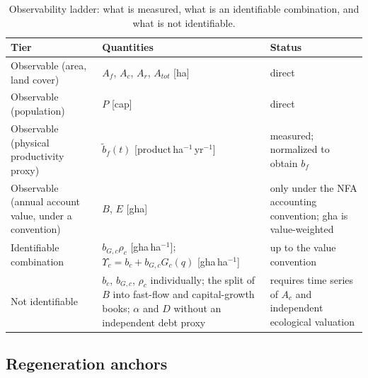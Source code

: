 \documentclass[11pt,a4paper]{article}
\newcommand{\Ups}{\Upsilon_c}
\begin{document}
\begin{table}[htbp]
\centering\small
\caption{Observability ladder: what is measured, what is an identifiable combination, and what is not identifiable.}
\label{tab:si_ladder}
\begin{tabularx}{\textwidth}{>{\raggedright\arraybackslash}p{} X >{\raggedright\arraybackslash}p{}}
\toprule
Tier & Quantities & Status \\
\midrule
Observable (area, land cover) & $A_f$, $A_c$, $A_r$, $A_{tot}$ [ha] & direct \\
Observable (population) & $P$ [cap] & direct \\
Observable (physical productivity proxy) & $\tilde b_f(t)$ [product\,ha$^{-1}$\,yr$^{-1}$] & measured; normalized to obtain $b_f$ \\
Observable (annual account value, under a convention) & $B$, $E$ [gha] & only under the NFA accounting convention; gha is value-weighted \\
Identifiable combination & $b_{G,c}\rho_c$ [gha\,ha$^{-1}$]; $\Ups=b_c+b_{G,c}G_c(q)$ [gha\,ha$^{-1}$] & up to the value convention \\
Not identifiable & $b_c$, $b_{G,c}$, $\rho_c$ individually; the split of $B$ into fast-flow and capital-growth books; $\alpha$ and $D$ without an independent debt proxy & requires time series of $A_c$ and independent ecological valuation \\
\bottomrule
\end{tabularx}
\end{table}

\subsection{Regeneration anchors}\label{si:anchors}
\end{document}
